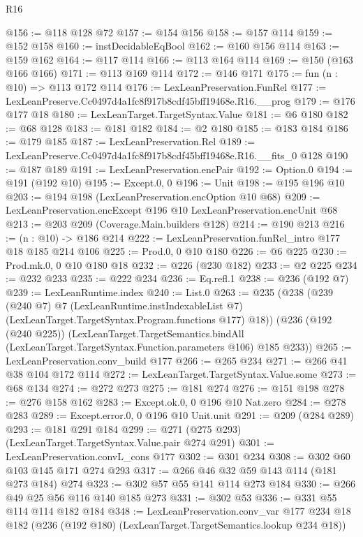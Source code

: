 \begin{lexlean}{R16}
\begin{coremodule}
@156 := @118 @128 @72
@157 := @154 @156
@158 := @157 @114
@159 := @152 @158
@160 := instDecidableEqBool
@162 := @160 @156 @114
@163 := @159 @162
@164 := @117 @114
@166 := @113 @164 @114
@169 := @150 (@163 @166 @166)
@171 := @113 @169 @114
@172 := @146 @171
@175 := fun (n : @10) => @113 @172 @114
@176 := LexLeanPreservation.FunRel
@177 := LexLeanPreserve.Cc0497d4a1fc8f917b8cdf45bff19468e.R16.__prog
@179 := @176 @177 @18
@180 := LexLeanTarget.TargetSyntax.Value
@181 := @6 @180
@182 := @68 @128
@183 := @181 @182
@184 := @2 @180
@185 := @183 @184
@186 := @179 @185
@187 := LexLeanPreservation.Rel
@189 := LexLeanPreserve.Cc0497d4a1fc8f917b8cdf45bff19468e.R16.__fits_0 @128
@190 := @187 @189
@191 := LexLeanPreservation.encPair
@192 := Option.{0}
@194 := @191 (@192 @10)
@195 := Except.{0, 0}
@196 := Unit
@198 := @195 @196 @10
@203 := @194 @198 (LexLeanPreservation.encOption @10 @68)
@209 := LexLeanPreservation.encExcept @196 @10 LexLeanPreservation.encUnit @68
@213 := @203 @209 (Coverage.Main.builders @128)
@214 := @190 @213
@216 := (n : @10) -> @186 @214
@222 := LexLeanPreservation.funRel_intro @177 @18 @185 @214 @106
@225 := Prod.{0, 0} @10 @180
@226 := @6 @225
@230 := Prod.mk.{0, 0} @10 @180 @18
@232 := @226 (@230 @182)
@233 := @2 @225
@234 := @232 @233
@235 := @222 @234
@236 := Eq.refl.{1}
@238 := @236 (@192 @7)
@239 := LexLeanRuntime.index
@240 := List.{0}
@263 := @235
    (@238
      (@239
        (@240 @7)
        @7
        (LexLeanRuntime.instIndexableList @7)
        (LexLeanTarget.TargetSyntax.Program.functions @177)
        @18))
    (@236
      (@192 (@240 @225))
      (LexLeanTarget.TargetSemantics.bindAll
        (LexLeanTarget.TargetSyntax.Function.parameters @106)
        @185
        @233))
@265 := LexLeanPreservation.conv_build @177
@266 := @265 @234
@271 := @266 @41 @38 @104 @172 @114
@272 := LexLeanTarget.TargetSyntax.Value.some
@273 := @68 @134
@274 := @272 @273
@275 := @181 @274
@276 := @151 @198
@278 := @276 @158 @162
@283 := Except.ok.{0, 0} @196 @10 Nat.zero
@284 := @278 @283
@289 := Except.error.{0, 0} @196 @10 Unit.unit
@291 := @209 (@284 @289)
@293 := @181 @291 @184
@299 := @271 (@275 @293) (LexLeanTarget.TargetSyntax.Value.pair @274 @291)
@301 := LexLeanPreservation.convL_cons @177
@302 := @301 @234
@308 := @302 @60 @103 @145 @171 @274 @293
@317 := @266 @46 @32 @59 @143 @114 (@181 @273 @184) @274
@323 := @302 @57 @55 @141 @114 @273 @184
@330 := @266 @49 @25 @56 @116 @140 @185 @273
@331 := @302 @53
@336 := @331 @55 @114 @114 @182 @184
@348 := LexLeanPreservation.conv_var
    @177
    @234
    @18
    @182
    (@236 (@192 @180) (LexLeanTarget.TargetSemantics.lookup @234 @18))

\end{coremodule}
\end{lexlean}
